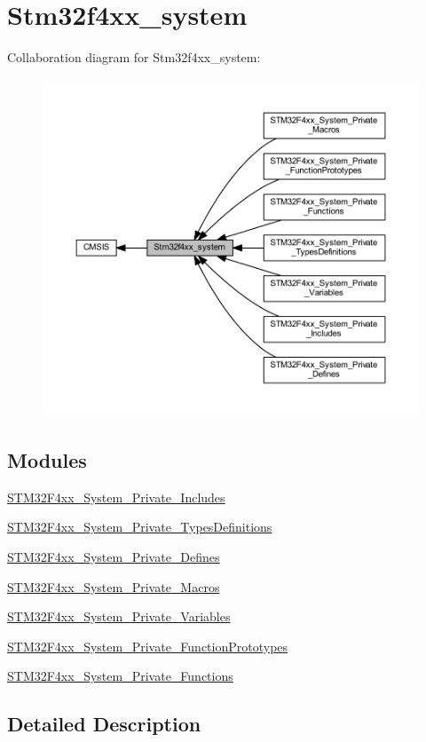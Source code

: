 \hypertarget{group__stm32f4xx__system}{}\section{Stm32f4xx\+\_\+system}
\label{group__stm32f4xx__system}
Collaboration diagram for Stm32f4xx\+\_\+system\+:
\nopagebreak
\begin{figure}[H]
\begin{center}
\leavevmode
\includegraphics[width=350pt]{group__stm32f4xx__system}
\end{center}
\end{figure}
\subsection*{Modules}
\begin{DoxyCompactItemize}
\item 
\mbox{\hyperlink{group___s_t_m32_f4xx___system___private___includes}{S\+T\+M32\+F4xx\+\_\+\+System\+\_\+\+Private\+\_\+\+Includes}}
\item 
\mbox{\hyperlink{group___s_t_m32_f4xx___system___private___types_definitions}{S\+T\+M32\+F4xx\+\_\+\+System\+\_\+\+Private\+\_\+\+Types\+Definitions}}
\item 
\mbox{\hyperlink{group___s_t_m32_f4xx___system___private___defines}{S\+T\+M32\+F4xx\+\_\+\+System\+\_\+\+Private\+\_\+\+Defines}}
\item 
\mbox{\hyperlink{group___s_t_m32_f4xx___system___private___macros}{S\+T\+M32\+F4xx\+\_\+\+System\+\_\+\+Private\+\_\+\+Macros}}
\item 
\mbox{\hyperlink{group___s_t_m32_f4xx___system___private___variables}{S\+T\+M32\+F4xx\+\_\+\+System\+\_\+\+Private\+\_\+\+Variables}}
\item 
\mbox{\hyperlink{group___s_t_m32_f4xx___system___private___function_prototypes}{S\+T\+M32\+F4xx\+\_\+\+System\+\_\+\+Private\+\_\+\+Function\+Prototypes}}
\item 
\mbox{\hyperlink{group___s_t_m32_f4xx___system___private___functions}{S\+T\+M32\+F4xx\+\_\+\+System\+\_\+\+Private\+\_\+\+Functions}}
\end{DoxyCompactItemize}


\subsection{Detailed Description}
